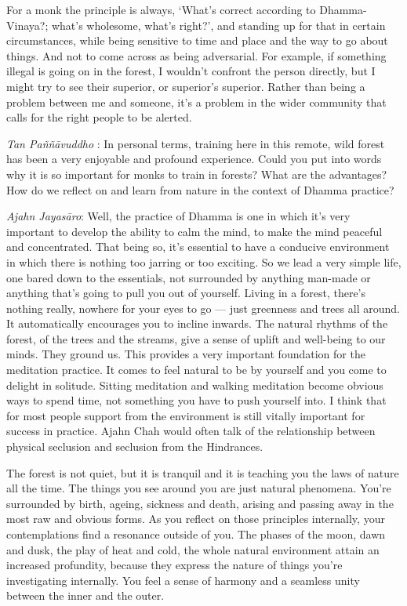 For a monk the principle is always, `What's correct according to
Dhamma-Vinaya?; what's wholesome, what's right?', and standing up for
that in certain circumstances, while being sensitive to time and place
and the way to go about things. And not to come across as being
adversarial. For example, if something illegal is going on in the
forest, I wouldn't confront the person directly, but I might try to see
their superior, or superior's superior. Rather than being a problem
between me and someone, it's a problem in the wider community that calls
for the right people to be alerted.

\emph{Tan Paññāvuddho} : In personal terms, training here in this
remote, wild forest has been a very enjoyable and profound experience.
Could you put into words why it is so important for monks to train in
forests? What are the advantages? How do we reflect on and learn from
nature in the context of Dhamma practice?

\emph{Ajahn Jayasāro‎}: Well, the practice of Dhamma is one in which
it's very important to develop the ability to calm the mind, to make the
mind peaceful and concentrated. That being so, it's essential to have a
conducive environment in which there is nothing too jarring or too
exciting. So we lead a very simple life, one bared down to the
essentials, not surrounded by anything man-made or anything that's going
to pull you out of yourself. Living in a forest, there's nothing really,
nowhere for your eyes to go --- just greenness and trees all around. It
automatically encourages you to incline inwards. The natural rhythms of
the forest, of the trees and the streams, give a sense of uplift and
well-being to our minds. They ground us. This provides a very important
foundation for the meditation practice. It comes to feel natural to be
by yourself and you come to delight in solitude. Sitting meditation and
walking meditation become obvious ways to spend time, not something you
have to push yourself into. I think that for most people support from
the environment is still vitally important for success in practice.
Ajahn Chah would often talk of the relationship between physical
seclusion and seclusion from the Hindrances.

The forest is not quiet, but it is tranquil and it is teaching you the
laws of nature all the time. The things you see around you are just
natural phenomena. You're surrounded by birth, ageing, sickness and
death, arising and passing away in the most raw and obvious forms. As
you reflect on those principles internally, your contemplations find a
resonance outside of you. The phases of the moon, dawn and dusk, the
play of heat and cold, the whole natural environment attain an increased
profundity, because they express the nature of things you're
investigating internally. You feel a sense of harmony and a seamless
unity between the inner and the outer.

